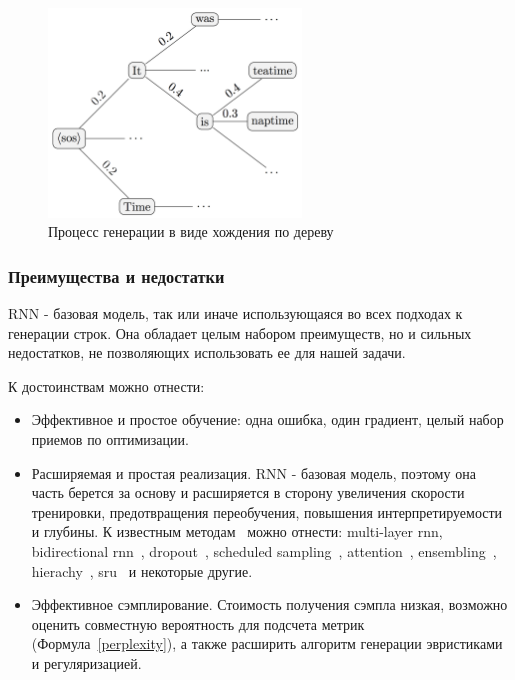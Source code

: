 \documentclass{spbau-diploma}
\begin{document}
\begin{figure}[H]
\centering
\includegraphics[width=0.6\textwidth]{images/beam_search.png}
\caption{Процесс генерации в виде хождения по дереву}
\label{beam_search}
\end{figure}

\subsubsection{Преимущества и недостатки}
RNN - базовая модель, так или иначе использующаяся во всех подходах к генерации
строк. Она обладает целым набором преимуществ, но и сильных недостатков, не
позволяющих использовать ее для нашей задачи.

К достоинствам можно отнести:
\begin{itemize}
    \item Эффективное и простое обучение: одна ошибка, один градиент, целый 
    набор приемов по оптимизации.
    \item Расширяемая и простая реализация. RNN - базовая модель, поэтому она
    часть берется за основу и расширяется в сторону увеличения скорости 
    тренировки, предотвращения переобучения, повышения интерпретируемости и 
    глубины. К известным методам~\cite{bengio_rnn} можно отнести: 
    multi-layer rnn, bidirectional rnn~\cite{bidir_rnn}, 
    dropout~\cite{wiki:dropout}, scheduled sampling~\cite{1506.03099},
    attention~\cite{attention_rnn}, ensembling~\cite{wiki:ensebling},
    hierachy~\cite{1609.01704}, sru~\cite{1709.02755} и некоторые другие.
    \item Эффективное сэмплирование. Стоимость получения сэмпла низкая, возможно
    оценить совместную вероятность для подсчета метрик (Формула~\ref{perplexity}),
    а также расширить алгоритм генерации эвристиками и регуляризацией.
\end{itemize}
\end{document}
